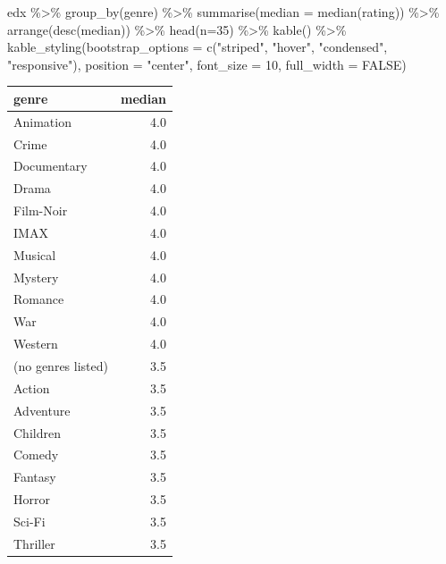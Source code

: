 \documentclass[
]{article}
\newenvironment{Shaded}{}{}
\newcommand{\AttributeTok}[1]{\textcolor[rgb]{0.49,0.56,0.16}{#1}}
\newcommand{\ConstantTok}[1]{\textcolor[rgb]{0.53,0.00,0.00}{#1}}
\newcommand{\DecValTok}[1]{\textcolor[rgb]{0.25,0.63,0.44}{#1}}
\newcommand{\FunctionTok}[1]{\textcolor[rgb]{0.02,0.16,0.49}{#1}}
\newcommand{\NormalTok}[1]{#1}
\newcommand{\SpecialCharTok}[1]{\textcolor[rgb]{0.25,0.44,0.63}{#1}}
\newcommand{\StringTok}[1]{\textcolor[rgb]{0.25,0.44,0.63}{#1}}
\begin{document}
\begin{Shaded}
\begin{Highlighting}[]
\NormalTok{edx }\SpecialCharTok{\%\textgreater{}\%}
   \FunctionTok{group\_by}\NormalTok{(genre) }\SpecialCharTok{\%\textgreater{}\%}
   \FunctionTok{summarise}\NormalTok{(}\AttributeTok{median =} \FunctionTok{median}\NormalTok{(rating)) }\SpecialCharTok{\%\textgreater{}\%}
   \FunctionTok{arrange}\NormalTok{(}\FunctionTok{desc}\NormalTok{(median)) }\SpecialCharTok{\%\textgreater{}\%}
   \FunctionTok{head}\NormalTok{(}\AttributeTok{n=}\DecValTok{35}\NormalTok{) }\SpecialCharTok{\%\textgreater{}\%}
   \FunctionTok{kable}\NormalTok{() }\SpecialCharTok{\%\textgreater{}\%}
   \FunctionTok{kable\_styling}\NormalTok{(}\AttributeTok{bootstrap\_options =} \FunctionTok{c}\NormalTok{(}\StringTok{"striped"}\NormalTok{, }\StringTok{"hover"}\NormalTok{, }\StringTok{"condensed"}\NormalTok{, }\StringTok{"responsive"}\NormalTok{),}
                 \AttributeTok{position =} \StringTok{"center"}\NormalTok{,}
                 \AttributeTok{font\_size =} \DecValTok{10}\NormalTok{,}
                 \AttributeTok{full\_width =} \ConstantTok{FALSE}\NormalTok{)}
\end{Highlighting}
\end{Shaded}

\begin{table}
\centering\begingroup\fontsize{10}{12}\selectfont

\begin{tabular}{l|r}
\hline
genre & median\\
\hline
Animation & 4.0\\
\hline
Crime & 4.0\\
\hline
Documentary & 4.0\\
\hline
Drama & 4.0\\
\hline
Film-Noir & 4.0\\
\hline
IMAX & 4.0\\
\hline
Musical & 4.0\\
\hline
Mystery & 4.0\\
\hline
Romance & 4.0\\
\hline
War & 4.0\\
\hline
Western & 4.0\\
\hline
(no genres listed) & 3.5\\
\hline
Action & 3.5\\
\hline
Adventure & 3.5\\
\hline
Children & 3.5\\
\hline
Comedy & 3.5\\
\hline
Fantasy & 3.5\\
\hline
Horror & 3.5\\
\hline
Sci-Fi & 3.5\\
\hline
Thriller & 3.5\\
\hline
\end{tabular}
\endgroup{}
\end{table}
\end{document}
